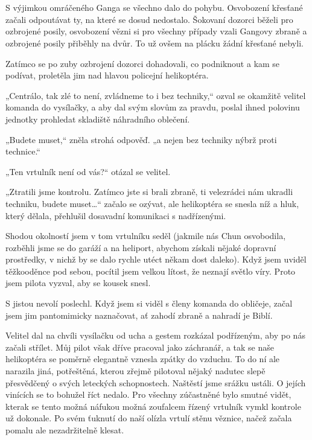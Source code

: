 \chapter{}

S výjimkou omráčeného Ganga se všechno dalo do pohybu. Osvobození křesťané začali odpoutávat ty, na které se dosud nedostalo. Šokovaní dozorci běželi pro ozbrojené posily, osvobození vězni si pro všechny případy vzali Gangovy zbraně a ozbrojené posily přiběhly na dvůr. To už ovšem na plácku žádní křesťané nebyli.

Zatímco se po zuby ozbrojení dozorci dohadovali, co podniknout a kam se podívat, proletěla jim nad hlavou policejní helikoptéra.

„Centrálo, tak zlé to není, zvládneme to i bez techniky,“ ozval se okamžitě velitel komanda do vysílačky, a aby dal svým slovům za pravdu, poslal ihned polovinu jednotky prohledat skladiště náhradního oblečení.

„Budete muset,“ zněla strohá odpověď. „a nejen bez techniky nýbrž proti technice.“

„Ten vrtulník není od vás?“ otázal se velitel.

„Ztratili jsme kontrolu. Zatímco jste si brali zbraně, ti velezrádci nám ukradli techniku, budete muset…“ začalo se ozývat, ale helikoptéra se snesla níž a hluk, který dělala, přehlušil dosavadní komunikaci s nadřízenými.

Shodou okolností jsem v tom vrtulníku seděl (jakmile nás Chun osvobodila, rozběhli jsme se do garáží a na heliport, abychom získali nějaké dopravní prostředky, v nichž by se dalo rychle utéct někam dost daleko). Když jsem uviděl těžkooděnce pod sebou, pocítil jsem velkou lítost, že neznají světlo víry. Proto jsem pilota vyzval, aby se kousek snesl.

S jistou nevolí poslechl. Když jsem si viděl s členy komanda do obličeje, začal jsem jim pantomimicky naznačovat, ať zahodí zbraně a nahradí je Biblí.

Velitel dal na chvíli vysílačku od ucha a gestem rozkázal podřízeným, aby po nás začali střílet. Můj pilot však dříve pracoval jako záchranář, a tak se naše helikoptéra se poměrně elegantně vznesla zpátky do vzduchu. To do ní ale narazila jiná, potřeštěná, kterou zřejmě pilotoval nějaký nadutec slepě přesvědčený o svých leteckých schopnostech.
Naštěstí jsme srážku ustáli. O jejích vinících se to bohužel říct nedalo. Pro všechny zúčastněné bylo smutné vidět, kterak se tento možná náfukou možná zoufalcem řízený vrtulník vymkl kontrole už dokonale. Po svém ťuknutí do naší olízla vrtulí stěnu věznice, načež začala pomalu ale nezadržitelně klesat. 

